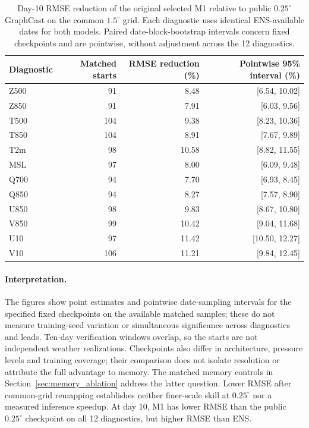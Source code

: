 \documentclass{article}
\newcommand{\vfourchange}[1]{{\color{blue}#1}}
\begin{document}
\begin{table}[!htbp]
    \centering
    \small
    \begingroup\color{blue}
    \begin{tabular}{lrrr}
        \toprule
        Diagnostic & Matched starts & RMSE reduction (\%) & Pointwise 95\% interval (\%) \\
        \midrule
        Z500 & 91 & 8.48 & [6.54, 10.02] \\
        Z850 & 91 & 7.91 & [6.03, 9.56] \\
        T500 & 104 & 9.38 & [8.23, 10.36] \\
        T850 & 104 & 8.91 & [7.67, 9.89] \\
        T2m & 98 & 10.58 & [8.82, 11.55] \\
        MSL & 97 & 8.00 & [6.09, 9.48] \\
        Q700 & 94 & 7.70 & [6.93, 8.45] \\
        Q850 & 94 & 8.27 & [7.57, 8.90] \\
        U850 & 98 & 9.83 & [8.67, 10.80] \\
        V850 & 99 & 10.42 & [9.04, 11.68] \\
        U10 & 97 & 11.42 & [10.50, 12.27] \\
        V10 & 106 & 11.21 & [9.84, 12.45] \\
        \bottomrule
    \end{tabular}
    \endgroup
    \caption{\vfourchange{Day-10 RMSE reduction of the original selected M1 relative to public $0.25^\circ$ GraphCast on the common $1.5^\circ$ grid. Each diagnostic uses identical ENS-available dates for both models. Paired date-block-bootstrap intervals concern fixed checkpoints and are pointwise, without adjustment across the 12 diagnostics.}}
    \label{tab:common_grid_intervals}
\end{table}

\FloatBarrier
\paragraph{\vfourchange{Interpretation.}}
\vfourchange{The figures show point estimates and pointwise date-sampling intervals for the specified fixed checkpoints on the available matched samples; these do not measure training-seed variation or simultaneous significance across diagnostics and leads. Ten-day verification windows overlap, so the starts are not independent weather realizations. Checkpoints also differ in architecture, pressure levels and training coverage; their comparison does not isolate resolution or attribute the full advantage to memory. The matched memory controls in Section~\ref{sec:memory_ablation} address the latter question. Lower RMSE after common-grid remapping establishes neither finer-scale skill at $0.25^\circ$ nor a measured inference speedup. At day 10, M1 has lower RMSE than the public $0.25^\circ$ checkpoint on all 12 diagnostics, but higher RMSE than ENS.}
\end{document}
